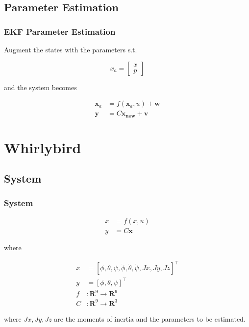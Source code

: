\documentclass[10pt]{beamer}
\begin{document}
\subsection{Parameter Estimation}

\begin{frame}

\frametitle{EKF Parameter Estimation}

Augment the states with the parameters s.t.

$$ x_{a} = 
\begin{bmatrix}
x \\
p
\end{bmatrix}
$$

and the system becomes 

  \begin{align*}
  \mathbf{x}_{a} &= f(\mathbf{x}_{a},u) + \mathbf{w}\\
  \mathbf{y} &= C\mathbf{x_{new}} + \mathbf{v}
  \end{align*}


\end{frame}

%
\section{Whirlybird}
\subsection{System}

\begin{frame}

\frametitle{System}

\begin{align*}
  x &= f(x,u) \\
  y &= C\mathbf{x}
\end{align*}

where 

\begin{align*}
 x &= [\phi, \theta, \psi, \dot{\phi}, \dot{\theta}, \dot{\psi}, Jx, Jy, Jz]^\top \\
 y & = [\phi, \theta, \psi]^\top \\
 f &: \mathbf{R}^9 \rightarrow \mathbf{R}^9 \\
 C &: \mathbf{R}^9 \rightarrow \mathbf{R}^3
\end{align*}


where $Jx, Jy, Jz$ are the moments of inertia and the parameters to be estimated.




\end{frame}
\end{document}
